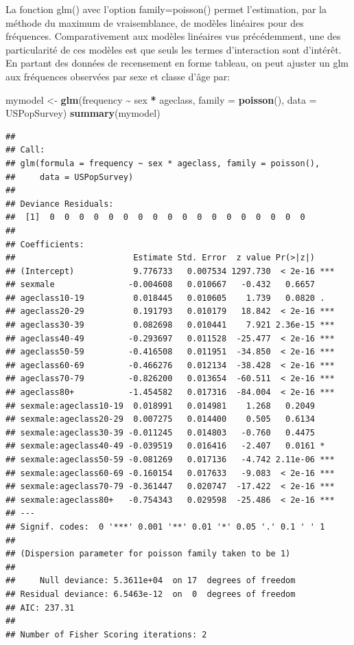 \documentclass[
  12pt,
]{book}
\newenvironment{Shaded}{\begin{snugshade}}{\end{snugshade}}
\newcommand{\DataTypeTok}[1]{\textcolor[rgb]{0.13,0.29,0.53}{#1}}
\newcommand{\KeywordTok}[1]{\textcolor[rgb]{0.13,0.29,0.53}{\textbf{#1}}}
\newcommand{\NormalTok}[1]{#1}
\newcommand{\OperatorTok}[1]{\textcolor[rgb]{0.81,0.36,0.00}{\textbf{#1}}}
\newcommand{\StringTok}[1]{\textcolor[rgb]{0.31,0.60,0.02}{#1}}
\begin{document}
La fonction glm() avec l'option family=poisson() permet l'estimation, par la méthode du maximum de vraisemblance, de modèles linéaires pour des fréquences. Comparativement aux modèles linéaires vus précédemment, une des particularité de ces modèles est que seuls les termes d'interaction sont d'intérêt. En partant des données de recensement en forme tableau, on peut ajuster un glm aux fréquences observées par sexe et classe d'âge par:

\begin{Shaded}
\begin{Highlighting}[]
\NormalTok{mymodel \textless{}{-}}\StringTok{ }\KeywordTok{glm}\NormalTok{(frequency }\OperatorTok{\textasciitilde{}}\StringTok{ }\NormalTok{sex }\OperatorTok{*}\StringTok{ }\NormalTok{ageclass, }\DataTypeTok{family =} \KeywordTok{poisson}\NormalTok{(), }\DataTypeTok{data =}\NormalTok{ USPopSurvey)}
\KeywordTok{summary}\NormalTok{(mymodel)}
\end{Highlighting}
\end{Shaded}

\begin{verbatim}
## 
## Call:
## glm(formula = frequency ~ sex * ageclass, family = poisson(), 
##     data = USPopSurvey)
## 
## Deviance Residuals: 
##  [1]  0  0  0  0  0  0  0  0  0  0  0  0  0  0  0  0  0  0
## 
## Coefficients:
##                        Estimate Std. Error  z value Pr(>|z|)    
## (Intercept)            9.776733   0.007534 1297.730  < 2e-16 ***
## sexmale               -0.004608   0.010667   -0.432   0.6657    
## ageclass10-19          0.018445   0.010605    1.739   0.0820 .  
## ageclass20-29          0.191793   0.010179   18.842  < 2e-16 ***
## ageclass30-39          0.082698   0.010441    7.921 2.36e-15 ***
## ageclass40-49         -0.293697   0.011528  -25.477  < 2e-16 ***
## ageclass50-59         -0.416508   0.011951  -34.850  < 2e-16 ***
## ageclass60-69         -0.466276   0.012134  -38.428  < 2e-16 ***
## ageclass70-79         -0.826200   0.013654  -60.511  < 2e-16 ***
## ageclass80+           -1.454582   0.017316  -84.004  < 2e-16 ***
## sexmale:ageclass10-19  0.018991   0.014981    1.268   0.2049    
## sexmale:ageclass20-29  0.007275   0.014400    0.505   0.6134    
## sexmale:ageclass30-39 -0.011245   0.014803   -0.760   0.4475    
## sexmale:ageclass40-49 -0.039519   0.016416   -2.407   0.0161 *  
## sexmale:ageclass50-59 -0.081269   0.017136   -4.742 2.11e-06 ***
## sexmale:ageclass60-69 -0.160154   0.017633   -9.083  < 2e-16 ***
## sexmale:ageclass70-79 -0.361447   0.020747  -17.422  < 2e-16 ***
## sexmale:ageclass80+   -0.754343   0.029598  -25.486  < 2e-16 ***
## ---
## Signif. codes:  0 '***' 0.001 '**' 0.01 '*' 0.05 '.' 0.1 ' ' 1
## 
## (Dispersion parameter for poisson family taken to be 1)
## 
##     Null deviance: 5.3611e+04  on 17  degrees of freedom
## Residual deviance: 6.5463e-12  on  0  degrees of freedom
## AIC: 237.31
## 
## Number of Fisher Scoring iterations: 2
\end{verbatim}
\end{document}
